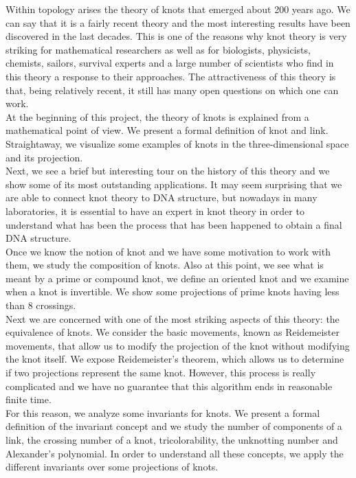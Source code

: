 Within topology arises the theory of knots that emerged about 200 years ago. We can say that it is a fairly recent theory and the most interesting results have been discovered in the last decades. This is one of the reasons why knot theory is very striking for mathematical researchers as well as for biologists, physicists, chemists, sailors, survival experts and a large number of scientists who find in this theory a response to their approaches. The attractiveness of this theory is that, being relatively recent, it still has many open questions on which one can work.\\






At the beginning of this project, the theory of knots is explained from a mathematical point of view. We present a formal definition of knot and link.  Straightaway, we visualize some examples of knots in the three-dimensional space and its projection.\\


Next, we see a brief but interesting tour on the history of this theory and we show some of its most outstanding applications. It may seem surprising that we are able to connect knot theory to DNA structure, but nowadays in many laboratories, it is essential to have an expert in knot theory in order to understand what has been the process that has been happened to obtain a final DNA structure.\\


Once we know the notion of knot and we have some motivation to work with them, we study the composition of knots. Also at this point, we see what is meant by a prime or compound knot, we define an oriented knot and we examine when a knot is invertible. We show some projections of prime knots having less than 8 crossings.\\


Next we are concerned with one of the most striking aspects of this theory: the equivalence of knots. We consider the basic movements, known as Reidemeister movements, that allow us to modify the projection of the knot without modifying the knot itself. We expose Reidemeister's theorem, which allows us to determine if two projections represent the same knot. However, this process is really complicated and we have no guarantee that this algorithm ends in reasonable finite time.\\


For this reason, we analyze some invariants for knots. We present a formal definition of the invariant concept and we study the number of components of a link, the crossing number of a knot, tricolorability, the unknotting number and Alexander's polynomial. In order to understand all these concepts, we apply the different invariants over some projections of knots.\\ 


